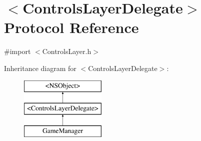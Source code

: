 \hypertarget{protocol_controls_layer_delegate-p}{\section{$<$Controls\-Layer\-Delegate$>$ Protocol Reference}
\label{db/d3c/protocol_controls_layer_delegate-p}
}


{\ttfamily \#import $<$Controls\-Layer.\-h$>$}

Inheritance diagram for $<$Controls\-Layer\-Delegate$>$\-:\begin{figure}[H]
\begin{center}
\leavevmode
\includegraphics[height=3.000000cm]{db/d3c/protocol_controls_layer_delegate-p}
\end{center}
\end{figure}
